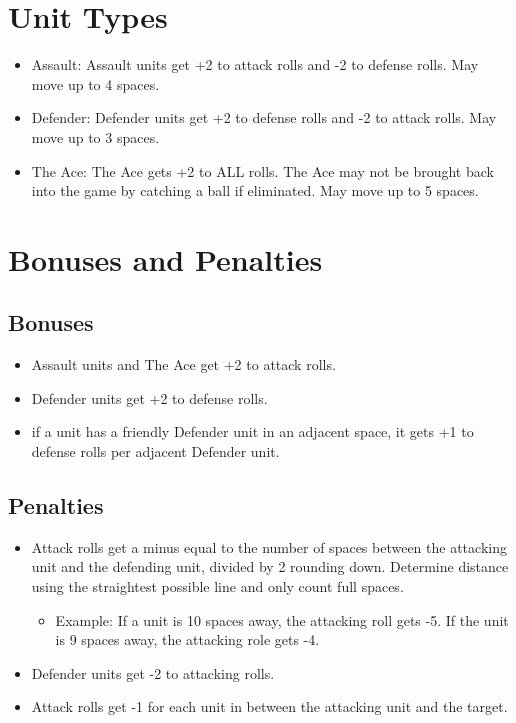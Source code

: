 \documentclass[10pt]{article}
\begin{document}
\section*{Unit Types}
\begin{itemize}
\item Assault: Assault units get +2 to attack rolls and -2 to defense rolls. May move up to 4 spaces.
\item Defender: Defender units get +2 to defense rolls and -2 to attack rolls. May move up to 3 spaces.
\item The Ace: The Ace gets +2 to ALL rolls. The Ace may not be brought back into the game by catching a ball if eliminated. May move up to 5 spaces.
\end{itemize}

\section*{Bonuses and Penalties}
\subsection*{Bonuses}
	\begin{itemize}
	\item Assault units and The Ace get +2 to attack rolls.
	\item Defender units get +2 to defense rolls.
	\item if a unit has a friendly Defender unit in an adjacent space, it gets +1 to defense rolls per adjacent Defender unit.
	\end{itemize}

\subsection*{Penalties}
	\begin{itemize}
	\item Attack rolls get a minus equal to the number of spaces between the attacking unit and the defending unit, divided by 2 rounding down. Determine distance using the straightest possible line and only count full spaces.
		\begin{itemize}
		\item Example: If a unit is 10 spaces away, the attacking roll gets -5. If the unit is 9 spaces away, the attacking role gets -4.
		\end{itemize}
	\item Defender units get -2 to attacking rolls.
	\item Attack rolls get -1 for each unit in between the attacking unit and the target.
	\end{itemize}
\end{document}

